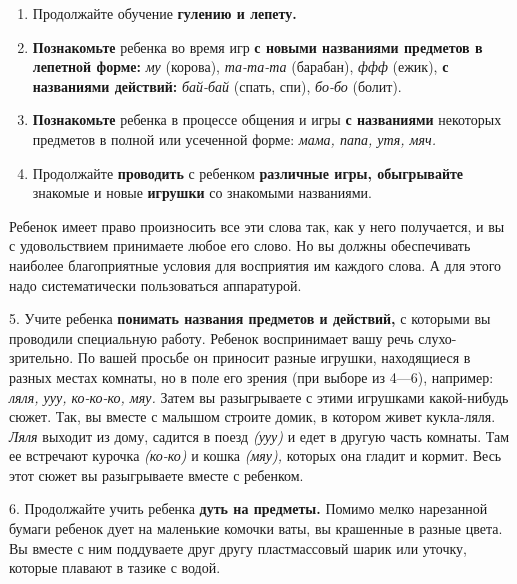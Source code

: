 \documentclass{book}
\renewcommand{\emph}[1]{\textit{#1}}
\begin{document}
\begin{enumerate}
\def\labelenumi{\arabic{enumi}.}
\item
  
  Продолжайте обучение \textbf{гулению и лепету.}
  
\item
  
  \textbf{Познакомьте} ребенка во время игр \textbf{с новыми названиями
  предметов в лепетной форме:} \emph{му} (корова), \emph{та-та-та}
  (барабан), \emph{ффф} (ежик), \textbf{с названиями действий:}
  \emph{бай-бай} (спать, спи), \emph{бо-бо} (болит).
  
\item
  
  \textbf{Познакомьте} ребенка в процессе общения и игры \textbf{с
  названиями} некоторых предметов в полной или усеченной форме:
  \emph{мама, папа, утя, мяч.}
  
\item
  
  Продолжайте \textbf{проводить} с ребенком \textbf{различные игры,
  обыгрывайте} знакомые и новые \textbf{игрушки} со знакомыми
  названиями.
  
\end{enumerate}


Ребенок имеет право произносить все эти слова так, как у него
получается, и вы с удовольствием принимаете любое его слово. Но вы
должны обеспечивать наиболее благоприятные условия для восприятия им
каждого слова. А для этого надо систематически пользоваться аппаратурой.

5. Учите ребенка \textbf{понимать названия предметов и действий,} с
которыми вы проводили специальную работу. Ребенок воспринимает вашу речь
слухо-зрительно. По вашей просьбе он приносит разные игрушки,
находящиеся в разных местах комнаты, но в поле его зрения (при выборе из
4---6), например: \emph{ляля, ууу, ко-ко-ко, мяу.} Затем вы разыгрываете
с этими игрушками какой-нибудь сюжет. Так, вы вместе с малышом строите
домик, в котором живет кукла-ляля. \emph{Ляля} выходит из дому, садится
в поезд \emph{(ууу)} и едет в другую часть комнаты. Там ее встречают
курочка \emph{(ко-ко)} и кошка \emph{(мяу),} которых она гладит и
кормит. Весь этот сюжет вы разыгрываете вместе с ребенком.

6. Продолжайте учить ребенка \textbf{дуть на предметы.} Помимо мелко
нарезанной бумаги ребенок дует на маленькие комочки ваты, вы крашенные в
разные цвета. Вы вместе с ним поддуваете друг другу пластмассовый шарик
или уточку, которые плавают в тазике с водой.
\end{document}
